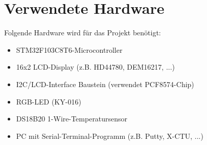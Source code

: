 \documentclass[12pt,a4paper]{article}
\begin{document}
	\section{Verwendete Hardware}
	Folgende Hardware wird für das Projekt benötigt:
	\begin{itemize}
		\item STM32F103C8T6-Microcontroller
		\item 16x2 LCD-Display (z.B. HD44780, DEM16217, ...)
		\item I2C/LCD-Interface Baustein (verwendet PCF8574-Chip)
		\item RGB-LED (KY-016)
		\item DS18B20 1-Wire-Temperatursensor
		\item PC mit Serial-Terminal-Programm (z.B. Putty, X-CTU, ...)
	\end{itemize}
\end{document}
